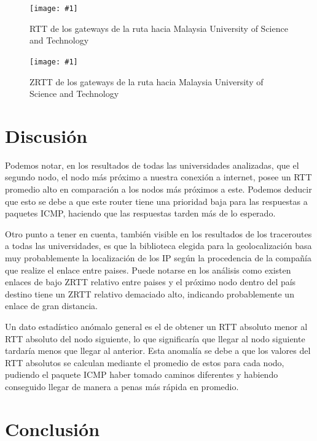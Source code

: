 \documentclass[a4paper, 10pt, twoside]{article}
\newcommand{\grafico}[3]{
  \begin{figure}[H]
    \texttt{[image: \#1]}
    \caption{#2}
    \label{#3}
  \end{figure}
}
\newcommand{\must}{Malaysia University of Science and Technology}
\begin{document}
\grafico{rtt-www.must.edu.my}
        {RTT de los gateways de la ruta hacia \must}
        {fig:rtt-must}

\grafico{zrtt-www.must.edu.my}
        {ZRTT de los gateways de la ruta hacia \must}
        {fig:zrtt-must}




\section{Discusión}

Podemos notar, en los resultados de todas las universidades analizadas, que el segundo nodo, el nodo más próximo a nuestra conexión a internet, posee un RTT promedio alto en comparación a los nodos más próximos a este. Podemos deducir que esto se debe a que este router tiene una prioridad baja para las respuestas a paquetes ICMP, haciendo que las respuestas tarden más de lo esperado.


Otro punto a tener en cuenta, también visible en los resultados de los traceroutes a todas las universidades, es que la biblioteca elegida para la geolocalización basa muy probablemente la localización de los IP según la procedencia de la compañía que realize el enlace entre paises. Puede notarse en los análisis como existen enlaces de bajo ZRTT relativo entre paises y el próximo nodo dentro del país destino tiene un ZRTT relativo demaciado alto, indicando probablemente un enlace de gran distancia.

Un dato estadístico anómalo general es el de obtener un RTT absoluto menor al RTT absoluto del nodo siguiente, lo que significaría que llegar al nodo siguiente tardaría menos que llegar al anterior. Esta anomalía se debe a que los valores del RTT absolutos se calculan mediante el promedio de estos para cada nodo, pudiendo el paquete ICMP haber tomado caminos diferentes y habiendo conseguido llegar de manera a penas más rápida en promedio.





\section{Conclusión}
\end{document}

